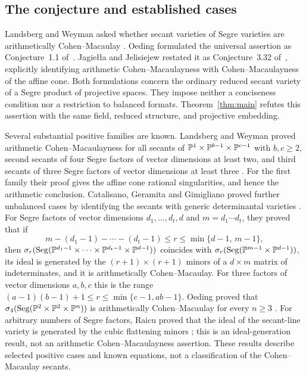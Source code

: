 \subsection{The conjecture and established cases}\label{sec:history}

Landsberg and Weyman asked whether secant varieties of Segre varieties
are arithmetically Cohen--Macaulay
\cite[Introduction, p.~3 of the arXiv version]{LandsbergWeyman2007}.
Oeding formulated the universal assertion as Conjecture~1.1
of~\cite{Oeding2016}.
Jagie\l\l a and Jelisiejew restated it as Conjecture~3.32
of~\cite{JagiellaJelisiejew2026}, explicitly identifying arithmetic
Cohen--Macaulayness with Cohen--Macaulayness of the affine cone.
Both formulations concern the ordinary reduced secant variety of
a Segre product of projective spaces. They impose neither a
conciseness condition nor a restriction to balanced formats.
Theorem~\ref{thm:main} refutes this assertion with the same field,
reduced structure, and projective embedding.

Several substantial positive families are known. Landsberg and Weyman
proved arithmetic Cohen--Macaulayness for all secants of
$\mathbb P^1\times\mathbb P^{b-1}\times\mathbb P^{c-1}$ with $b,c\geq2$, second secants
of four Segre factors of vector dimensions at least two, and third
secants of three Segre factors of vector dimensions at least three
\cite[Theorems~1.1--1.3]{LandsbergWeyman2007}.
For the first family their proof gives the affine cone rational
singularities, and hence the arithmetic conclusion.
Catalisano, Geramita and Gimigliano proved further unbalanced cases
by identifying the secants with generic determinantal varieties
\cite[Theorem~2.4]{CatalisanoGeramitaGimigliano2008}. For Segre
factors of vector dimensions $d_1,\ldots,d_t,d$ and
$m=d_1\cdots d_t$, they proved that if
\[
 m-(d_1-1)-\cdots-(d_t-1)\leq r\leq\min\{d-1,\,m-1\},
\]
then $\sigma_r(\operatorname{Seg}(\mathbb P^{d_1-1}\times\cdots\times\mathbb P^{d_t-1}\times\mathbb P^{d-1}))$
coincides with $\sigma_r(\operatorname{Seg}(\mathbb P^{m-1}\times\mathbb P^{d-1}))$, its ideal is
generated by the $(r+1)\times(r+1)$ minors of a $d\times m$ matrix of
indeterminates, and it is arithmetically Cohen--Macaulay. For three
factors of vector dimensions $a,b,c$ this is the range
$(a-1)(b-1)+1\leq r\leq\min\{c-1,ab-1\}$.
Oeding proved that $\sigma_4(\operatorname{Seg}(\mathbb P^2\times\mathbb P^2
\times\mathbb P^n))$ is arithmetically Cohen--Macaulay for every $n\geq3$
\cite[Theorem~3.2]{Oeding2016}.
For arbitrary numbers of Segre factors, Raicu proved that the ideal
of the secant-line variety is generated by the cubic flattening
minors \cite[Corollary~4.2]{Raicu2012}; this is an ideal-generation
result, not an arithmetic Cohen--Macaulayness assertion.
These results describe selected positive cases and known equations,
not a classification of the Cohen--Macaulay secants.

